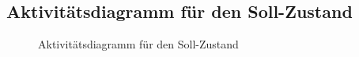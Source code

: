 \subsection{Aktivitätsdiagramm für den Soll-Zustand}
\label{app:Akti}
\begin{figure}[htb]
\centering
{}
\caption{Aktivitätsdiagramm für den Soll-Zustand}
\end{figure}
